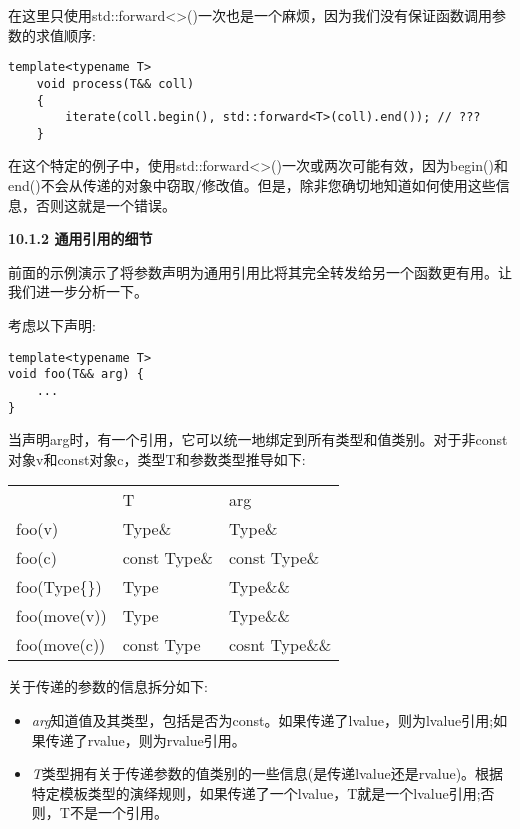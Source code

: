 在这里只使用std::forward<>()一次也是一个麻烦，因为我们没有保证函数调用参数的求值顺序:\par

\begin{lstlisting}[caption={}]
	template<typename T>
	void process(T&& coll)
	{
		iterate(coll.begin(), std::forward<T>(coll).end()); // ???
	}
\end{lstlisting}

在这个特定的例子中，使用std::forward<>()一次或两次可能有效，因为begin()和end()不会从传递的对象中窃取/修改值。但是，除非您确切地知道如何使用这些信息，否则这就是一个错误。\par

\hspace*{\fill} \par %
\textbf{10.1.2 通用引用的细节}

前面的示例演示了将参数声明为通用引用比将其完全转发给另一个函数更有用。让我们进一步分析一下。\par

考虑以下声明:\par

\begin{lstlisting}[caption={}]
template<typename T>
void foo(T&& arg) {
	...
}
\end{lstlisting}

当声明arg时，有一个引用，它可以统一地绑定到所有类型和值类别。对于非const对象v和const对象c，类型T和参数类型推导如下:\par

\begin{table}[H]
	\begin{tabular}{lll}
		& T            & arg            \\
		foo(v)        & Type\&       & Type\&         \\
		foo(c)        & const Type\& & const Type\&   \\
		foo(Type\{\}) & Type         & Type\&\&       \\
		foo(move(v))  & Type         & Type\&\&       \\
		foo(move(c))  & const Type   & cosnt Type\&\&
	\end{tabular}
\end{table}

关于传递的参数的信息拆分如下:\par

\begin{itemize}
	\item \textit{arg}知道值及其类型，包括是否为const。如果传递了lvalue，则为lvalue引用;如果传递了rvalue，则为rvalue引用。
	\item \textit{T}类型拥有关于传递参数的值类别的一些信息(是传递lvalue还是rvalue)。根据特定模板类型的演绎规则，如果传递了一个lvalue，T就是一个lvalue引用;否则，T不是一个引用。
\end{itemize}

